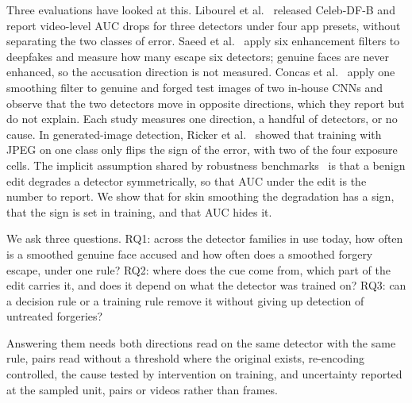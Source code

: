 \documentclass[conference]{IEEEtran}
\begin{document}
Three evaluations have looked at this. Libourel et al.~\cite{libourel2024} released Celeb-DF-B and report video-level AUC
drops for three detectors under four app presets, without separating the two classes of error. Saeed et al.~\cite{saeed2025}
apply six enhancement filters to deepfakes and measure how many escape six detectors; genuine faces are never enhanced, so
the accusation direction is not measured. Concas et al.~\cite{concas2025} apply one smoothing filter to genuine and forged
test images of two in-house CNNs and observe that the two detectors move in opposite directions, which they report but do
not explain. Each study measures one direction, a handful of detectors, or no cause. In generated-image detection, Ricker et
al.~\cite{ricker2026biasid} showed that training with JPEG on one class only flips the sign of the error, with two of the
four exposure cells. The implicit assumption shared by robustness benchmarks~\cite{deeperforensics2020,moire2025,hendrycks2019}
is that a benign edit degrades a detector symmetrically, so that AUC under the edit is the number to report. We show that for
skin smoothing the degradation has a sign, that the sign is set in training, and that AUC hides it.

We ask three questions. RQ1: across the detector families in use today, how often is a smoothed genuine face accused and
how often does a smoothed forgery escape, under one rule? RQ2: where does the cue come from, which part of the edit carries
it, and does it depend on what the detector was trained on? RQ3: can a decision rule or a training rule remove it without
giving up detection of untreated forgeries?

Answering them needs both directions read on the same detector with the same rule, pairs read without a threshold where
the original exists, re-encoding controlled, the cause tested by intervention on training, and uncertainty reported at the
sampled unit, pairs or videos rather than frames.
\end{document}
